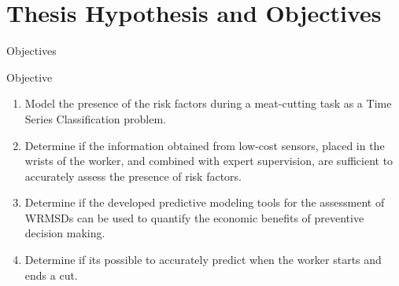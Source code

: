 \section{Thesis Hypothesis and Objectives}
\frame{\sectionpage}



\begin{frame}{Objectives}
    \begin{alertblock}{Objective}
   \begin{enumerate}
       \item Model the presence of the risk factors during a meat-cutting task as a Time Series Classification problem.
       \item Determine if the information obtained from low-cost sensors, placed in the wrists of the worker, and combined with expert supervision, are sufficient to accurately assess the presence of risk factors.
       \item Determine if the developed predictive modeling tools for the assessment of WRMSDs can be used to quantify the economic benefits of preventive decision making.
       \item Determine if its possible to accurately predict when the worker starts and ends a cut.
   \end{enumerate} 
    \end{alertblock}
\end{frame}



